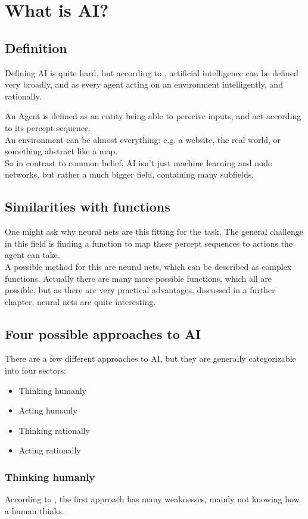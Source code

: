 \chapter{What is AI?}

\section{Definition}
Defining AI is quite hard, but according to \cite{russellArtificialIntelligenceModern2010}, artificial intelligence can be defined very broadly, and as every agent acting on an environment intelligently, and rationally.

An Agent is defined as an entity being able to perceive inputs, and act according to its percept sequence.\\ 
An environment can be almost everything: e.g. a website, the real world, or something abstract like a map.\\ 
So in contrast to common belief, AI isn't just machine learning and node networks, but rather a much bigger field, containing many subfields.

\section{Similarities with functions}
One might ask why neural nets are this fitting for the task,  The general challenge in this field is finding a function to map these percept sequences to actions the agent can take. \\ 
A possible method for this are neural nets, which can be described as complex functions. Actually there are many more possible functions, which all are possible, but as there are very practical advantages, discussed in a further chapter, neural nets are quite interesting.

\section{Four possible approaches to AI}
There are a few different approaches to AI, but they are generally categorizable into four sectors: 
\begin{itemize}
    \item Thinking humanly
    \item Acting humanly
    \item Thinking rationally
    \item Acting rationally
\end{itemize}
\subsection{Thinking humanly}
According to \cite[page 3]{russellArtificialIntelligenceModern2010}, the first approach has many weaknesses, mainly not knowing how a human thinks.
